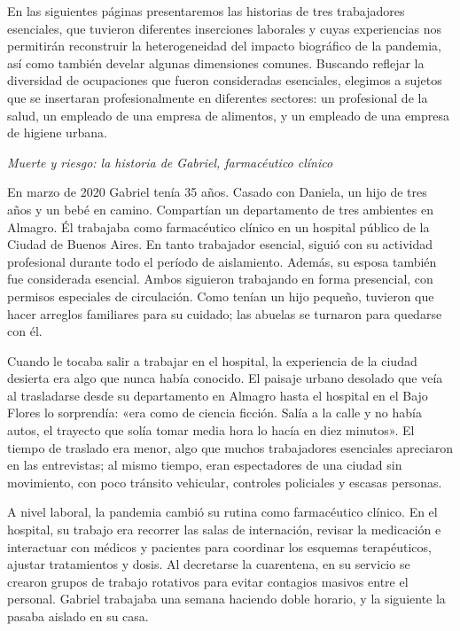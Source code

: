 En las siguientes páginas presentaremos las historias de tres trabajadores esenciales, que tuvieron diferentes inserciones laborales y cuyas experiencias nos permitirán reconstruir la heterogeneidad del impacto biográfico de la pandemia, así como también develar algunas dimensiones comunes. Buscando reflejar la diversidad de ocupaciones que fueron consideradas esenciales, elegimos a sujetos que se insertaran profesionalmente en diferentes sectores: un profesional de la salud, un empleado de una empresa de alimentos, y un empleado de una empresa de higiene urbana.

\emph{Muerte y riesgo: la historia de Gabriel, farmacéutico clínico}

En marzo de 2020 Gabriel tenía 35 años. Casado con Daniela, un hijo de tres años y un bebé en camino. Compartían un departamento de tres ambientes en Almagro. Él trabajaba como farmacéutico clínico en un hospital público de la Ciudad de Buenos Aires. En tanto trabajador esencial, siguió con su actividad profesional durante todo el período de aislamiento. Además, su esposa también fue considerada esencial. Ambos siguieron trabajando en forma presencial, con permisos especiales de circulación. Como tenían un hijo pequeño, tuvieron que hacer arreglos familiares para su cuidado; las abuelas se turnaron para quedarse con él.

Cuando le tocaba salir a trabajar en el hospital, la experiencia de la ciudad desierta era algo que nunca había conocido. El paisaje urbano desolado que veía al trasladarse desde su departamento en Almagro hasta el hospital en el Bajo Flores lo sorprendía: «era como de ciencia ficción. Salía a la calle y no había autos, el trayecto que solía tomar media hora lo hacía en diez minutos». El tiempo de traslado era menor, algo que muchos trabajadores esenciales apreciaron en las entrevistas; al mismo tiempo, eran espectadores de una ciudad sin movimiento, con poco tránsito vehicular, controles policiales y escasas personas.

A nivel laboral, la pandemia cambió su rutina como farmacéutico clínico. En el hospital, su trabajo era recorrer las salas de internación, revisar la medicación e interactuar con médicos y pacientes para coordinar los esquemas terapéuticos, ajustar tratamientos y dosis. Al decretarse la cuarentena, en su servicio se crearon grupos de trabajo rotativos para evitar contagios masivos entre el personal. Gabriel trabajaba una semana haciendo doble horario, y la siguiente la pasaba aislado en su casa.

